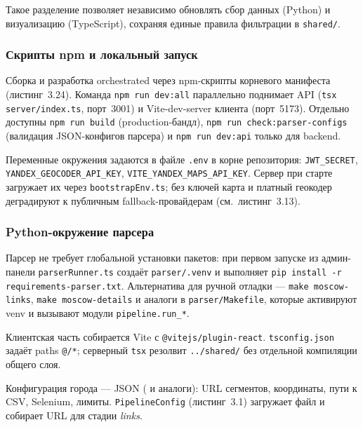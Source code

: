 Такое разделение позволяет независимо обновлять сбор данных (Python) и визуализацию (TypeScript), сохраняя единые правила фильтрации в \texttt{shared/}.

\subsubsection{Скрипты npm и локальный запуск}

Сборка и разработка orchestrated через npm-скрипты корневого манифеста (листинг~3.24). Команда \texttt{npm run dev:all} параллельно поднимает API (\texttt{tsx server/index.ts}, порт~3001) и Vite-dev-server клиента (порт~5173). Отдельно доступны \texttt{npm run build} (production-бандл), \texttt{npm run check:parser-configs} (валидация JSON-конфигов парсера) и \texttt{npm run dev:api} только для backend.

Переменные окружения задаются в файле \texttt{.env} в корне репозитория: \texttt{JWT\_SECRET}, \texttt{YANDEX\_GEOCODER\_API\_KEY}, \texttt{VITE\_YANDEX\_MAPS\_API\_KEY}. Сервер при старте загружает их через \texttt{bootstrapEnv.ts}; без ключей карта и платный геокодер деградируют к публичным fallback-провайдерам (см.~листинг~3.13).

\subsubsection{Python-окружение парсера}

Парсер не требует глобальной установки пакетов: при первом запуске из админ-панели \texttt{parserRunner.ts} создаёт \texttt{parser/.venv} и выполняет \texttt{pip install -r requirements-parser.txt}. Альтернатива для ручной отладки --- \texttt{make moscow-links}, \texttt{make moscow-details} и аналоги в \texttt{parser/Makefile}, которые активируют venv и вызывают модули \texttt{pipeline.run\_*}.

Клиентская часть собирается Vite с \texttt{@vitejs/plugin-react}. \texttt{tsconfig.json} задаёт paths \texttt{@/*}; серверный \texttt{tsx} резолвит \texttt{../shared/} без отдельной компиляции общего слоя.

Конфигурация города --- JSON ( и аналоги): URL сегментов, координаты, пути к CSV, Selenium, лимиты. \texttt{PipelineConfig} (листинг~3.1) загружает файл и собирает URL для стадии \emph{links}.

